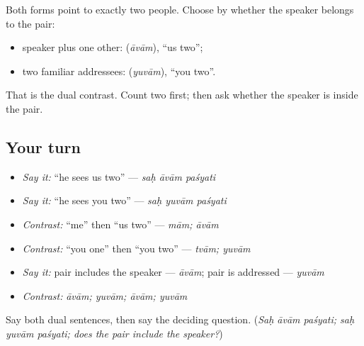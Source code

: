 \begin{grammarlens}[title={Grammar Lens: choose the pair}]
Both forms point to exactly two people. Choose by whether the speaker belongs to the pair:

\begin{itemize}
\raggedright
  \item speaker plus one other: \textbf{} (\emph{āvām}), “us two”;
  \item two familiar addressees: \textbf{} (\emph{yuvām}), “you two”.
\end{itemize}

That is the dual contrast. Count two first; then ask whether the speaker is inside the pair.
\end{grammarlens}

\subsection*{Your turn}
\begin{itemize}
\raggedright
  \item \emph{Say it:} “he sees us two” — \emph{saḥ āvām paśyati}
  \item \emph{Say it:} “he sees you two” — \emph{saḥ yuvām paśyati}
  \item \emph{Contrast:} “me” then “us two” — \emph{mām; āvām}
  \item \emph{Contrast:} “you one” then “you two” — \emph{tvām; yuvām}
  \item \emph{Say it:} pair includes the speaker — \emph{āvām}; pair is addressed — \emph{yuvām}
  \item \emph{Contrast:} \emph{āvām; yuvām; āvām; yuvām}
\end{itemize}

\begin{tcolorbox}[breakable,colback=teal!4,colframe=teal!35!black,title={Before you move on}]
Say both dual sentences, then say the deciding question. (\emph{Saḥ āvām paśyati; saḥ yuvām paśyati; does the pair include the speaker?})
\end{tcolorbox}
